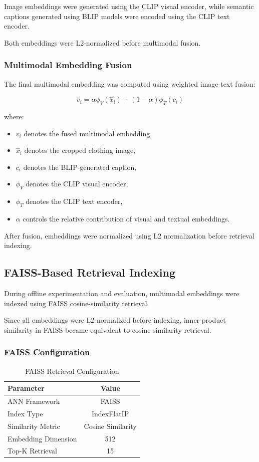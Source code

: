 \documentclass[11pt,a4paper]{article}
\begin{document}
Image embeddings were generated using the CLIP visual encoder, while semantic captions generated using BLIP models were encoded using the CLIP text encoder.

Both embeddings were L2-normalized before multimodal fusion.

\subsubsection{Multimodal Embedding Fusion}

The final multimodal embedding was computed using weighted image-text fusion:

\begin{equation}
v_i = \alpha \phi_V(\hat{x}_i) + (1 - \alpha)\phi_T(c_i)
\end{equation}

where:
\begin{itemize}
    \item $v_i$ denotes the fused multimodal embedding,
    \item $\hat{x}_i$ denotes the cropped clothing image,
    \item $c_i$ denotes the BLIP-generated caption,
    \item $\phi_V$ denotes the CLIP visual encoder,
    \item $\phi_T$ denotes the CLIP text encoder,
    \item $\alpha$ controls the relative contribution of visual and textual embeddings.
\end{itemize}

After fusion, embeddings were normalized using L2 normalization before retrieval indexing.

\subsection{FAISS-Based Retrieval Indexing}

During offline experimentation and evaluation, multimodal embeddings were indexed using FAISS cosine-similarity retrieval.

Since all embeddings were L2-normalized before indexing, inner-product similarity in FAISS became equivalent to cosine similarity retrieval.

\subsubsection{FAISS Configuration}

\begin{table}[H]
\centering
\caption{FAISS Retrieval Configuration}
\begin{tabular}{lc}
\toprule
Parameter & Value \\
\midrule
ANN Framework & FAISS \\
Index Type & IndexFlatIP \\
Similarity Metric & Cosine Similarity \\
Embedding Dimension & 512 \\
Top-K Retrieval & 15 \\
\bottomrule
\end{tabular}
\end{table}
\end{document}
